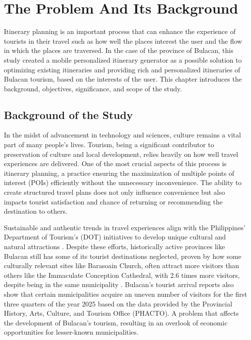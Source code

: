 \chapter{The Problem And Its Background}
\thispagestyle{empty}
Itinerary planning is an important process that can enhance the experience of tourists in their travel such as how well the places interest the user and the flow in which the places are traversed. In the case of the province of Bulacan, this study created a mobile personalized itinerary generator as a possible solution to optimizing existing itineraries and providing rich and personalized itineraries of Bulacan tourism, based on the interests of the user. This chapter introduces the background, objectives, significance, and scope of the study.

\section{Background of the Study}

In the midst of advancement in technology and sciences, culture remains a vital part of many people’s lives. Tourism, being a significant contributor to preservation of culture and local development, relies heavily on how well travel experiences are delivered. One of the most crucial aspects of this process is itinerary planning, a practice ensuring the maximization of multiple points of interest (POIs) efficiently without the unnecessary inconvenience. The ability to create structured travel plans does not only influence convenience but also impacts tourist satisfaction and chance of returning or recommending the destination to others.

Sustainable and authentic trends in travel experiences align with the Philippines’ Department of Tourism’s (DOT) initiatives to develop unique cultural and natural attractions \parencite{DOT2023}. Despite these efforts, historically active provinces like Bulacan still has some of its tourist destinations neglected, proven by how some culturally relevant sites like Barasoain Church, often attract more visitors than others like the Immaculate Conception Cathedral, with 2.6 times more visitors, despite being in the same municipality \parencite{Canet2025S}. Bulacan’s tourist arrival reports also show that certain municipalities acquire an uneven number of visitors for the first three quarters of the year 2025 based on the data provided by the  Provincial History, Arts, Culture, and Tourism Office (PHACTO). A problem that affects the development of Bulacan’s tourism, resulting in an overlook of economic opportunities for lesser-known municipalities.

